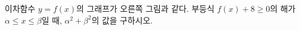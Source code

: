 \hspace*{2mm}\begin{minipage}[t]{\dimexpr\linewidth-2mm\relax}\vspace{0pt}
\noindent\begin{minipage}[t]{0.58\linewidth}\vspace{0pt}\raggedright 이차함수 $y=f(x)$의 그래프가 오른쪽 그림과 같다. 부등식 $f(x)+8\ge 0$의 해가 $\alpha\le x\le \beta$일 때, $\alpha^2+\beta^2$의 값을 구하시오.\end{minipage}\hfill\begin{minipage}[t]{0.4\linewidth}\vspace{0pt}\centering \resizebox{\ifdim\width>\linewidth\linewidth\else\width\fi}{!}{}\end{minipage}\par\end{minipage}
